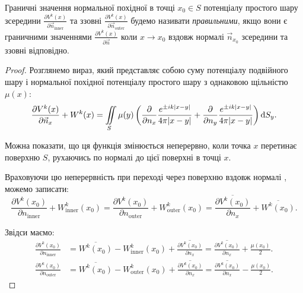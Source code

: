 \begin{definition}
	Граничні значення нормальної похідної в точці $x_0 \in S$ потенціалу простого шару зсередини $\frac{\partial V^k(x)}{\partial \vec n_{\text{inner}}}$ та ззовні $\frac{\partial V^k(x)}{\partial \vec n_{\text{outer}}}$ будемо називати \textit{правильними}, якщо вони є граничними значеннями $\frac{\partial V^k(x)}{\partial \vec n}$ коли $x \to x_0$ вздовж нормалі $\vec n_{x_0}$ зсередини та ззовні відповідно.
\end{definition}

\begin{proof}
	Розглянемо вираз, який представляє собою суму потенціалу подвійного шару і нормальної похідної потенціалу простого шару з  однаковою щільністю $\mu(x)$:
	\begin{equation}
		\frac{\partial V^k(x)}{\partial \vec n_x} + W^k(x) = \displaystyle\iint\limits_S \mu(y) \left( \frac{\partial}{\partial n_x} \frac{e^{\pm i k |x - y|}}{4 \pi |x - y|} + \frac{\partial}{\partial n_y} \frac{e^{\pm i k |x - y|}}{4 \pi |x - y|} \right) \mathop{}\!\mathrm{d} S_y.
	\end{equation}

	Можна показати, що ця функція змінюється неперервно, коли точка $x$ перетинає поверхню $S$, рухаючись по нормалі до цієї поверхні в точці $x$. \medskip

	Враховуючи цю неперервність при переході через поверхню вздовж нормалі , можемо записати:
	\begin{equation}
		\frac{\partial V^k(x_0)}{\partial n_{\text{inner}}} + W_{\text{inner}}^k(x_0) = \frac{\partial V^k(x_0)}{\partial n_{\text{outer}}} + W_{\text{outer}}^k(x_0) = \overline{\frac{\partial V^k(x_0)}{\partial n_x}} + \overline{W^k(x_0)}.
	\end{equation}

	Звідси маємо:
	\begin{align}
		\frac{\partial V^k(x_0)}{\partial n_{\text{inner}}} &= \overline{W^k(x_0)} - W_{\text{inner}}^k(x_0) + \overline{\frac{\partial V^k(x_0)}{\partial n_x}} = \overline{\frac{\partial V^k(x_0)}{\partial n_x}} + \frac{\mu(x_0)}{2}. \\
		\frac{\partial V^k(x_0)}{\partial n_{\text{outer}}} &= \overline{W^k(x_0)} - W_{\text{outer}}^k(x_0) + \overline{\frac{\partial V^k(x_0)}{\partial n_x}} = \overline{\frac{\partial V^k(x_0)}{\partial n_x}} - \frac{\mu(x_0)}{2}.
	\end{align}
\end{proof}
